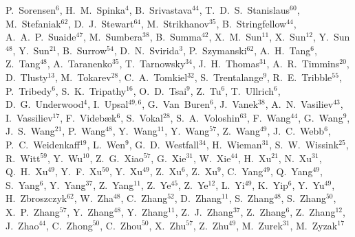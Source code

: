 {P.~Sorensen$^{6}$,
H.~M.~Spinka$^{4}$,
B.~Srivastava$^{44}$,
T.~D.~S.~Stanislaus$^{60}$,
M.~Stefaniak$^{62}$,
D.~J.~Stewart$^{64}$,
M.~Strikhanov$^{35}$,
B.~Stringfellow$^{44}$,
A.~A.~P.~Suaide$^{47}$,
M.~Sumbera$^{38}$,
B.~Summa$^{42}$,
X.~M.~Sun$^{11}$,
X.~Sun$^{12}$,
Y.~Sun$^{48}$,
Y.~Sun$^{21}$,
B.~Surrow$^{54}$,
D.~N.~Svirida$^{3}$,
P.~Szymanski$^{62}$,
A.~H.~Tang$^{6}$,
Z.~Tang$^{48}$,
A.~Taranenko$^{35}$,
T.~Tarnowsky$^{34}$,
J.~H.~Thomas$^{31}$,
A.~R.~Timmins$^{20}$,
D.~Tlusty$^{13}$,
M.~Tokarev$^{28}$,
C.~A.~Tomkiel$^{32}$,
S.~Trentalange$^{9}$,
R.~E.~Tribble$^{55}$,
P.~Tribedy$^{6}$,
S.~K.~Tripathy$^{16}$,
O.~D.~Tsai$^{9}$,
Z.~Tu$^{6}$,
T.~Ullrich$^{6}$,
D.~G.~Underwood$^{4}$,
I.~Upsal$^{49,6}$,
G.~Van~Buren$^{6}$,
J.~Vanek$^{38}$,
A.~N.~Vasiliev$^{43}$,
I.~Vassiliev$^{17}$,
F.~Videb{\ae}k$^{6}$,
S.~Vokal$^{28}$,
S.~A.~Voloshin$^{63}$,
F.~Wang$^{44}$,
G.~Wang$^{9}$,
J.~S.~Wang$^{21}$,
P.~Wang$^{48}$,
Y.~Wang$^{11}$,
Y.~Wang$^{57}$,
Z.~Wang$^{49}$,
J.~C.~Webb$^{6}$,
P.~C.~Weidenkaff$^{19}$,
L.~Wen$^{9}$,
G.~D.~Westfall$^{34}$,
H.~Wieman$^{31}$,
S.~W.~Wissink$^{25}$,
R.~Witt$^{59}$,
Y.~Wu$^{10}$,
Z.~G.~Xiao$^{57}$,
G.~Xie$^{31}$,
W.~Xie$^{44}$,
H.~Xu$^{21}$,
N.~Xu$^{31}$,
Q.~H.~Xu$^{49}$,
Y.~F.~Xu$^{50}$,
Y.~Xu$^{49}$,
Z.~Xu$^{6}$,
Z.~Xu$^{9}$,
C.~Yang$^{49}$,
Q.~Yang$^{49}$,
S.~Yang$^{6}$,
Y.~Yang$^{37}$,
Z.~Yang$^{11}$,
Z.~Ye$^{45}$,
Z.~Ye$^{12}$,
L.~Yi$^{49}$,
K.~Yip$^{6}$,
Y.~Yu$^{49}$,
H.~Zbroszczyk$^{62}$,
W.~Zha$^{48}$,
C.~Zhang$^{52}$,
D.~Zhang$^{11}$,
S.~Zhang$^{48}$,
S.~Zhang$^{50}$,
X.~P.~Zhang$^{57}$,
Y.~Zhang$^{48}$,
Y.~Zhang$^{11}$,
Z.~J.~Zhang$^{37}$,
Z.~Zhang$^{6}$,
Z.~Zhang$^{12}$,
J.~Zhao$^{44}$,
C.~Zhong$^{50}$,
C.~Zhou$^{50}$,
X.~Zhu$^{57}$,
Z.~Zhu$^{49}$,
M.~Zurek$^{31}$,
M.~Zyzak$^{17}$
}

